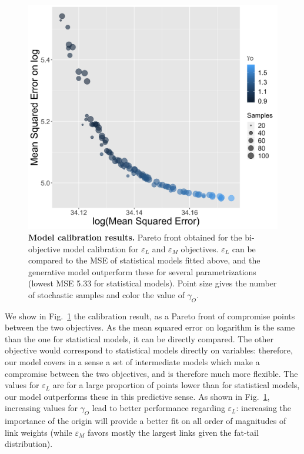 \documentclass[10pt,letterpaper]{article}
\providecommand{\DIFaddbeginFL}{} %
\providecommand{\DIFaddendFL}{} %
\begin{document}
\begin{figure}
    \DIFaddbeginFL \begin{center}
    \includegraphics[width=0.75\linewidth]{figures/Fig8.png}
    \end{center}
    \DIFaddendFL \vspace{2cm}
	\caption{\textbf{Model calibration results.} Pareto front obtained for the bi-objective model calibration for $\varepsilon_L$ and $\varepsilon_M$ objectives. $\varepsilon_L$ can be compared to the MSE of statistical models fitted above, and the generative model outperform these for several parametrizations (lowest MSE 5.33 for statistical models). Point size gives the number of stochastic samples and color the value of $\gamma_O$.\label{fig:fig8}}
\end{figure}


We show in Fig.~\ref{fig:fig8} the calibration result, as a Pareto front of compromise points between the two objectives. As the mean squared error on logarithm is the same than the one for statistical models, it can be directly compared. The other objective would correspond to statistical models directly on variables: therefore, our model covers in a sense a set of intermediate models which make a compromise between the two objectives, and is therefore much more flexible. The values for $\varepsilon_L$ are for a large proportion of points lower than for statistical models, our model outperforms these in this predictive sense. As shown in Fig.~\ref{fig:fig8}, increasing values for $\gamma_O$ lead to better performance regarding $\varepsilon_L$: increasing the importance of the origin will provide a better fit on all order of magnitudes of link weights (while $\varepsilon_M$ favors mostly the largest links given the fat-tail distribution).
\end{document}
